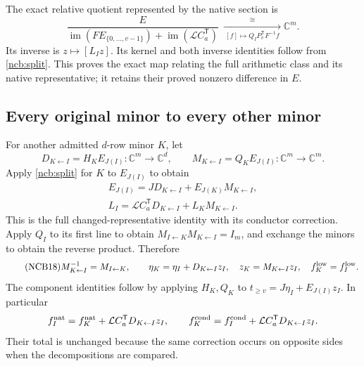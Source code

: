 \documentclass[11pt,a4paper]{article}
\begin{document}
The exact relative quotient represented by the native section is
\begin{equation}\tag{NCB15}\label{ncb:relative}
\frac{E}
 {\operatorname{im}(FE_{\{0,\ldots,v-1\}})
          +\operatorname{im}(\mathcal LC_a^{\mathsf T})}
\ \xrightarrow[\ [f]\mapsto Q_IP_v^{\mathsf T}F^{-1}f\ ]{\ \cong\ }
\mathbb C^m .
\end{equation}
Its inverse is $z\mapsto[L_Iz]$. Its kernel and both inverse identities
follow from \eqref{ncb:split}. This proves the exact map relating the
full arithmetic class and its native representative; it retains their
proved nonzero difference in $E$.

\subsection{Every original minor to every other minor}
For another admitted $d$-row minor $K$, let
\begin{equation}\tag{NCB16}\label{ncb:transition}
D_{K\leftarrow I}=H_KE_{J(I)}:\mathbb C^m\to\mathbb C^d,\qquad
M_{K\leftarrow I}=Q_KE_{J(I)}:\mathbb C^m\to\mathbb C^m .
\end{equation}
Apply \eqref{ncb:split} for $K$ to $E_{J(I)}$ to obtain
\begin{equation}\tag{NCB17}\label{ncb:section-transition}
\begin{gathered}
E_{J(I)}=JD_{K\leftarrow I}
              +E_{J(K)}M_{K\leftarrow I},\\
L_I=\mathcal LC_a^{\mathsf T}D_{K\leftarrow I}
              +L_KM_{K\leftarrow I}.
\end{gathered}
\end{equation}
This is the full changed-representative identity with its conductor
correction. Apply $Q_I$ to its first line to obtain
$M_{I\leftarrow K}M_{K\leftarrow I}=I_m$, and exchange the minors
to obtain the reverse product. Therefore
\begin{equation}\tag{NCB18}\label{ncb:inverse}
M_{K\leftarrow I}^{-1}=M_{I\leftarrow K},\qquad
\eta_K=\eta_I+D_{K\leftarrow I}z_I,\quad
z_K=M_{K\leftarrow I}z_I,\quad
f_K^{\rm low}=f_I^{\rm low}.
\end{equation}
The component identities follow by applying $H_K,Q_K$ to
$t_{\geq v}=J\eta_I+E_{J(I)}z_I$. In particular
\[
f_I^{\rm nat}=f_K^{\rm nat}
       +\mathcal LC_a^{\mathsf T}D_{K\leftarrow I}z_I,\qquad
f_K^{\rm cond}=f_I^{\rm cond}
       +\mathcal LC_a^{\mathsf T}D_{K\leftarrow I}z_I.
\]
Their total is unchanged because the same correction occurs on
opposite sides when the decompositions are compared.
\end{document}
